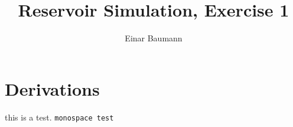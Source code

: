 \documentclass[11pt,a4paper]{article}
\title{Reservoir Simulation, Exercise 1}
\author{Einar Baumann}
\begin{document}
	\maketitle

	\section{Derivations} %
	\label{sec:derivations}
  this is a test. \texttt{monospace test}
	
  
\end{document}
